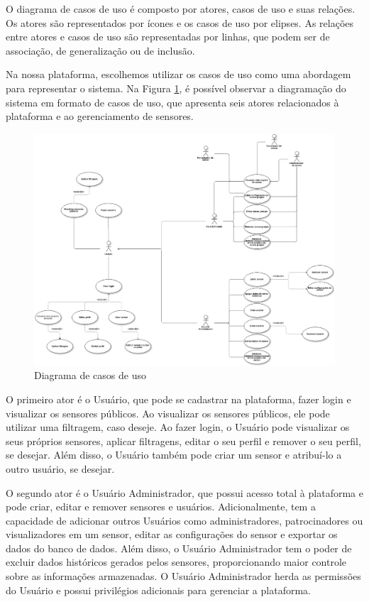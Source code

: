 \documentclass[tcc,capa]{texufpel}
\begin{document}
O diagrama de casos de uso é composto por atores, casos de uso e suas relações. Os atores são representados por ícones e os casos de uso por elipses. As relações entre atores e casos de uso são representadas por linhas, que podem ser de associação, de generalização ou de inclusão.

Na nossa plataforma, escolhemos utilizar os casos de uso como uma abordagem para representar o sistema. Na Figura \ref{casosuso}, é possível observar a diagramação do sistema em formato de casos de uso, que apresenta seis atores relacionados à plataforma e ao gerenciamento de sensores.

\begin{figure}[htbp]
  \centering \includegraphics[scale=.22]{assets/casosdeuso.png}
  \caption{Diagrama de casos de uso}
  \label{casosuso}
\end{figure}

O primeiro ator é o Usuário, que pode se cadastrar na plataforma, fazer login e visualizar os sensores públicos. Ao visualizar os sensores públicos, ele pode utilizar uma filtragem, caso deseje. Ao fazer login, o Usuário pode visualizar os seus próprios sensores, aplicar filtragens, editar o seu perfil e remover o seu perfil, se desejar. Além disso, o Usuário também pode criar um sensor e atribuí-lo a outro usuário, se desejar.

O segundo ator é o Usuário Administrador, que possui acesso total à plataforma e pode criar, editar e remover sensores e usuários. Adicionalmente, tem a capacidade de adicionar outros Usuários como administradores, patrocinadores ou visualizadores em um sensor, editar as configurações do sensor e exportar os dados do banco de dados. Além disso, o Usuário Administrador tem o poder de excluir dados históricos gerados pelos sensores, proporcionando maior controle sobre as informações armazenadas. O Usuário Administrador herda as permissões do Usuário e possui privilégios adicionais para gerenciar a plataforma.
\end{document}
